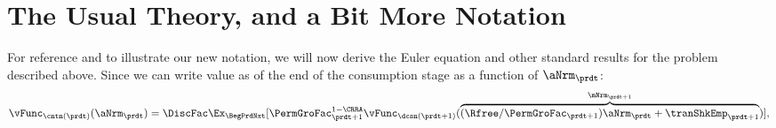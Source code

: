 
\hypertarget{the-usual-theory}{}
\section{The Usual Theory, and a Bit More Notation}\label{sec:the-usual-theory}


For reference and to illustrate our new notation, we will now derive the Euler equation and other standard results for the problem described above.
Since we can write value as of the end of the consumption stage as a function of $\aNrm_{\prdt}$:
\hypertarget{eq-vCntnExpansion}{}
\begin{equation}\begin{gathered}\begin{aligned}
  \vFunc_{{\cntn}(\prdt)}(\aNrm_{\prdt}) = \DiscFac \Ex_{\BegPrdNxt}[\PermGroFac_{\prdt+1}^{1-\CRRA}\vFunc_{\dcsn(\prdt+1)}(\overbrace{(\Rfree / \PermGroFac_{\prdt+1})\aNrm_{\prdt} +\tranShkEmp_{\prdt+1}}^{\mNrm_{\prdt+1}})], \label{eq:vCntnExpansion}
\end{aligned}\end{gathered}\end{equation}

\hypertarget{derivative-notation-convention}{}
